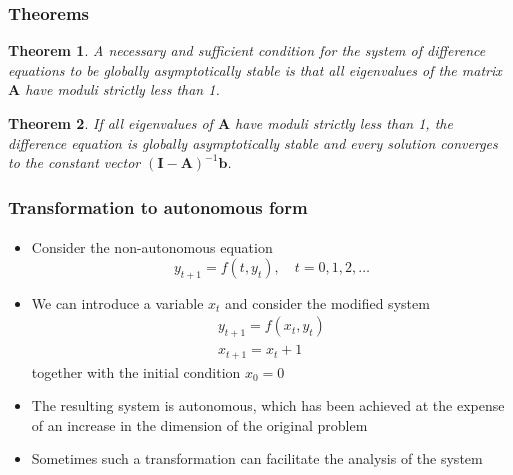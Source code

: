 \documentclass[10pt,usenames,dvipsnames]{beamer}
\theoremstyle{plain}
\newtheorem{thm}{Theorem}
\theoremstyle{definition}
\begin{document}
\begin{frame}[fragile]
\frametitle{Theorems}
\begin{thm}
	A necessary and sufficient condition for the system of difference equations to be globally asymptotically stable is that all eigenvalues of the matrix $\mathbf{A}$ have moduli strictly less than 1.
\end{thm}

\begin{thm}
	If all eigenvalues of $\mathbf{A}$ have moduli strictly less than 1, the difference equation is globally asymptotically stable and every solution converges to the constant vector $\mathbf{(I - A)}^{-1}\mathbf{b}$.
\end{thm}
\end{frame}


\begin{frame}
	\frametitle{Transformation to autonomous form}
	\framesubtitle{}
		\begin{itemize}\itemsep1em
		\item Consider the non-autonomous equation \[ y_{t+1} = f(t, y_{t}), \quad t = 0, 1, 2, \ldots \]
		\item We can introduce a variable $ x_t $ and consider the modified system 
			\[
		\begin{array}{l}
			y_{t+1} = f(x_t, y_t)\\
			x_{t+1} = x_t + 1
		\end{array}
		\] together with the initial condition $ x_0=0 $
		\item The resulting system is autonomous, which has been achieved at the expense of an increase in the dimension of the original problem
		\item Sometimes such a transformation can facilitate the analysis of the system 
	\end{itemize}
\end{frame}
\end{document}
